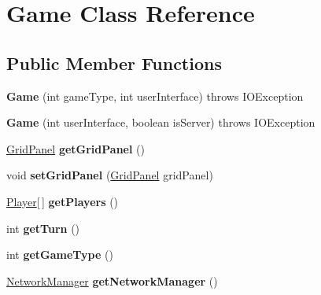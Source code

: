 \hypertarget{classGame}{}\section{Game Class Reference}
\label{classGame}
\subsection*{Public Member Functions}
\begin{DoxyCompactItemize}
\item 
{\bfseries Game} (int game\+Type, int user\+Interface)  throws I\+O\+Exception \hypertarget{classGame_ae0ca81a868814b02a8267768494527b2}{}\label{classGame_ae0ca81a868814b02a8267768494527b2}

\item 
{\bfseries Game} (int user\+Interface, boolean is\+Server)  throws I\+O\+Exception \hypertarget{classGame_af7ee3d5189c58ed74d0cb7783ce64632}{}\label{classGame_af7ee3d5189c58ed74d0cb7783ce64632}

\item 
\hyperlink{classGridPanel}{Grid\+Panel} {\bfseries get\+Grid\+Panel} ()\hypertarget{classGame_af4e648c25a25b73a4cd6fb97688a58ec}{}\label{classGame_af4e648c25a25b73a4cd6fb97688a58ec}

\item 
void {\bfseries set\+Grid\+Panel} (\hyperlink{classGridPanel}{Grid\+Panel} grid\+Panel)\hypertarget{classGame_a8bbad9db1c17da8848ff253aae44f69c}{}\label{classGame_a8bbad9db1c17da8848ff253aae44f69c}

\item 
\hyperlink{classPlayer}{Player}\mbox{[}$\,$\mbox{]} {\bfseries get\+Players} ()\hypertarget{classGame_a506ae8e369b87240b4c93e6da86d5cee}{}\label{classGame_a506ae8e369b87240b4c93e6da86d5cee}

\item 
int {\bfseries get\+Turn} ()\hypertarget{classGame_ae518e278826e5feba6f9fc5f3818ad02}{}\label{classGame_ae518e278826e5feba6f9fc5f3818ad02}

\item 
int {\bfseries get\+Game\+Type} ()\hypertarget{classGame_a21b344d249e50b6a12fbbb2ab15fd988}{}\label{classGame_a21b344d249e50b6a12fbbb2ab15fd988}

\item 
\hyperlink{interfaceNetworkManager}{Network\+Manager} {\bfseries get\+Network\+Manager} ()\hypertarget{classGame_a41a21632eaa1842822bf57161bea61e4}{}\label{classGame_a41a21632eaa1842822bf57161bea61e4}


\end{DoxyCompactItemize}
